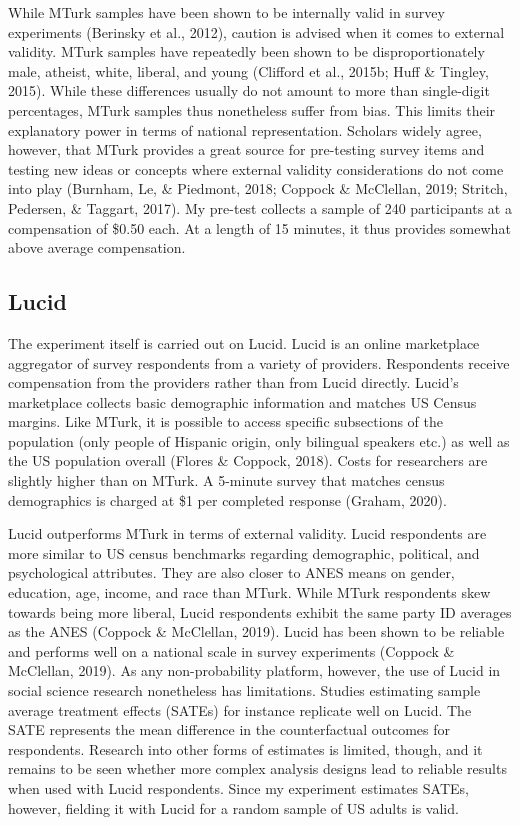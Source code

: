 \documentclass[12pt,econ]{sources/authesis}
\begin{document}
While MTurk samples have been shown to be internally valid in survey experiments (Berinsky et al., 2012), caution is advised when it comes to external validity. MTurk samples have repeatedly been shown to be disproportionately male, atheist, white, liberal, and young (Clifford et al., 2015b; Huff \& Tingley, 2015). While these differences usually do not amount to more than single-digit percentages, MTurk samples thus nonetheless suffer from bias. This limits their explanatory power in terms of national representation. Scholars widely agree, however, that MTurk provides a great source for pre-testing survey items and testing new ideas or concepts where external validity considerations do not come into play (Burnham, Le, \& Piedmont, 2018; Coppock \& McClellan, 2019; Stritch, Pedersen, \& Taggart, 2017). My pre-test collects a sample of 240 participants at a compensation of \$0.50 each. At a length of 15 minutes, it thus provides somewhat above average compensation.

\hypertarget{framing-data-lucid}{%
\subsection{Lucid}\label{framing-data-lucid}}

The experiment itself is carried out on Lucid. Lucid is an online marketplace aggregator of survey respondents from a variety of providers. Respondents receive compensation from the providers rather than from Lucid directly. Lucid's marketplace collects basic demographic information and matches US Census margins. Like MTurk, it is possible to access specific subsections of the population (only people of Hispanic origin, only bilingual speakers etc.) as well as the US population overall (Flores \& Coppock, 2018). Costs for researchers are slightly higher than on MTurk. A 5-minute survey that matches census demographics is charged at \$1 per completed response (Graham, 2020).

Lucid outperforms MTurk in terms of external validity. Lucid respondents are more similar to US census benchmarks regarding demographic, political, and psychological attributes. They are also closer to ANES means on gender, education, age, income, and race than MTurk. While MTurk respondents skew towards being more liberal, Lucid respondents exhibit the same party ID averages as the ANES (Coppock \& McClellan, 2019). Lucid has been shown to be reliable and performs well on a national scale in survey experiments (Coppock \& McClellan, 2019). As any non-probability platform, however, the use of Lucid in social science research nonetheless has limitations. Studies estimating sample average treatment effects (SATEs) for instance replicate well on Lucid. The SATE represents the mean difference in the counterfactual outcomes for respondents. Research into other forms of estimates is limited, though, and it remains to be seen whether more complex analysis designs lead to reliable results when used with Lucid respondents. Since my experiment estimates SATEs, however, fielding it with Lucid for a random sample of US adults is valid.
\end{document}
